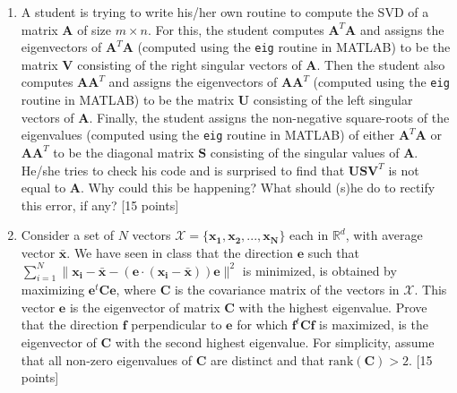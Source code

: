 \documentclass[11pt]{article}
\begin{document}
\begin{enumerate}
\item A student is trying to write his/her own routine to compute the SVD of a matrix $\boldsymbol{A}$ of size $m \times n$. For this, the student computes $\boldsymbol{A}^T \boldsymbol{A}$ and assigns the eigenvectors of $\boldsymbol{A}^T \boldsymbol{A}$ (computed using the \texttt{eig} routine in MATLAB) to be the matrix $\boldsymbol{V}$ consisting of the right singular vectors of $\boldsymbol{A}$. Then the student also computes $\boldsymbol{A} \boldsymbol{A}^T$ and assigns the eigenvectors of $\boldsymbol{A}\boldsymbol{A}^T$ (computed using the \texttt{eig} routine in MATLAB) to be the matrix $\boldsymbol{U}$ consisting of the left singular vectors of $\boldsymbol{A}$. Finally, the student assigns the non-negative square-roots of the eigenvalues (computed using the \texttt{eig} routine in MATLAB) of either $\boldsymbol{A}^T \boldsymbol{A}$ or $\boldsymbol{A} \boldsymbol{A}^T$ to be the diagonal matrix $\boldsymbol{S}$ consisting of the singular values of $\boldsymbol{A}$. He/she tries to check his code and is surprised to find that $\boldsymbol{USV}^T$ is not equal to $\boldsymbol{A}$. Why could this be happening? What should (s)he do to rectify this error, if any? \textsf{[15 points]}


\item Consider a set of $N$ vectors $\mathcal{X} = \{\boldsymbol{x_1}, \boldsymbol{x_2}, ..., \boldsymbol{x_N}\}$ each in $\mathbb{R}^d$, with average vector $\boldsymbol{\bar{x}}$. We have seen in class that the direction $\boldsymbol{e}$ such that $\sum_{i=1}^N \|\boldsymbol{x_i}-\boldsymbol{\bar{x}}-(\boldsymbol{e} \cdot (\boldsymbol{x_i}-\boldsymbol{\bar{x}}))\boldsymbol{e}\|^2$ is minimized, is obtained by maximizing $\boldsymbol{e}^t \boldsymbol{C} \boldsymbol{e}$, where $\boldsymbol{C}$ is the covariance matrix of the vectors in $\mathcal{X}$. This vector $\boldsymbol{e}$ is the eigenvector of matrix $\boldsymbol{C}$ with the highest eigenvalue. Prove that the direction $\boldsymbol{f}$ perpendicular to $\boldsymbol{e}$ for which $\boldsymbol{f}^t \boldsymbol{C} \boldsymbol{f}$ is maximized, is the eigenvector of $\boldsymbol{C}$ with the second highest eigenvalue. For simplicity, assume that all non-zero eigenvalues of $\boldsymbol{C}$ are distinct and that $\textrm{rank}(\boldsymbol{C}) > 2$. \textsf{[15 points]}


\end{enumerate}
\end{document}
